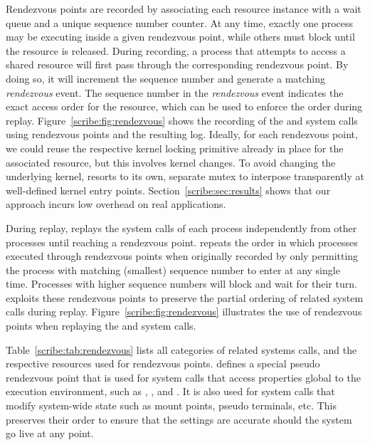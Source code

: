   

Rendezvous points are recorded by associating each resource instance 
with a wait queue and a unique sequence number counter. At
any time, exactly one process may be executing inside a given
rendezvous point, while others must block until the resource is
released.  During recording, a process that attempts to access a
shared resource will first pass through the corresponding rendezvous
point.  By doing so, it will increment the sequence number and
generate a matching {\em rendezvous} event. The sequence number in the
{\em rendezvous} event indicates the exact access order for the
resource, which can be used to enforce the order during replay.
Figure~\ref{scribe:fig:rendezvous} shows the recording of
the  and  system calls using rendezvous points
and the resulting log. 
Ideally, for each rendezvous point, we could reuse the respective
kernel locking primitive already in place for the associated
resource, but this involves kernel changes.  To avoid changing the
underlying kernel, \scribe{} resorts to its own, separate mutex to
interpose transparently at well-defined kernel entry points.
Section~\ref{scribe:sec:results} shows that our approach incurs low overhead
on real applications. 

During replay, \scribe{} replays the system calls of each process
independently from other processes until reaching a rendezvous point.
\scribe{} repeats the order in which processes executed through
rendezvous points when originally recorded by only permitting the
process with matching (smallest) sequence number to enter at any
single time. Processes with higher sequence numbers will block and
wait for their turn.  \scribe{} exploits these rendezvous points to
preserve the partial ordering of related system calls during replay.
Figure~\ref{scribe:fig:rendezvous} illustrates the use of rendezvous points
when replaying the  and  system calls.

  

Table~\ref{scribe:tab:rendezvous} lists all categories of related systems
calls, and the respective resources used for rendezvous points.
\scribe{} defines a special pseudo rendezvous point that
is used for system calls that access properties global to the
execution environment, such as , , and
. It is also used for system calls that modify
system-wide state such as mount points, pseudo terminals, etc.  This
preserves their order to ensure that the settings are accurate should
the system go live at any point.

